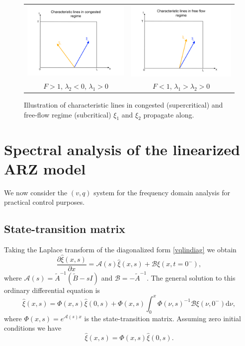 \documentclass[preprint]{elsarticle}
\begin{document}
\begin{figure}
\begin{centering}
\begin{tabular}{cc}
\includegraphics[width=6cm]{Congested-regime} & \includegraphics[width=6cm]{Free-flow-regime}\tabularnewline
$F>1$, $\lambda_{2}<0$, $\lambda_{1}>0$ & $F<1$, $\lambda_{1}>\lambda_{2}>0$\tabularnewline
\end{tabular}
\par\end{centering}
\protect\caption{Illustration of characteristic lines in congested (supercritical) and free-flow regime (subcritical) $\xi_1$ and $\xi_2$ propagate along.\label{Characteristics}}
\end{figure}


\section{Spectral analysis of the linearized ARZ model}
We now consider the $(v,q)$ system for the frequency domain analysis for practical control purposes.
\subsection{State-transition matrix}
Taking the Laplace transform of the diagonalized form \eqref{vqlindiag} we obtain 
\begin{equation}
\dfrac{\partial \hat{\xi} (x,s)}{\partial x} = \mathscr{A}(s)\hat{\xi}(x,s) + \mathscr{B}\xi(x,t=0^-),
\end{equation}
where $\mathscr{A}(s) = \tilde{A}^{-1}(\tilde{B} - sI)$ and $\mathscr{B} = -\tilde{A}^{-1}$. 
The general solution to this ordinary differential equation is 
\begin{equation}
\hat{\xi}(x,s) = \Phi(x,s)\hat{\xi}(0,s) +  \Phi(x,s) \int^x_0 \Phi(\nu,s)^{-1} \mathscr{B} \xi(\nu,0^-)\text{d} \nu,
\end{equation}
where $\Phi(x,s) = e^{\mathscr{A}(s)x}$ is the state-transition matrix. Assuming zero initial conditions we have 
\begin{equation} \label{TFRiemann}
\hat{\xi}(x,s) = \Phi(x,s)\hat{\xi}(0,s).
\end{equation}
\end{document}
